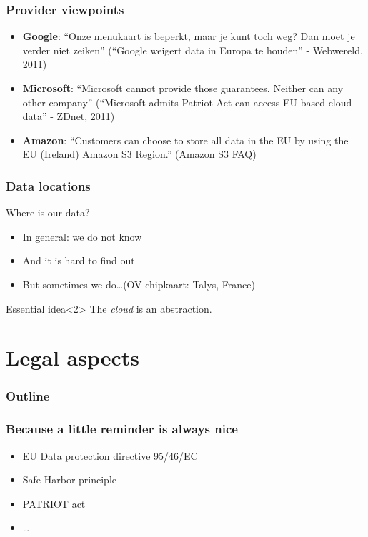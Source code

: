 \documentclass{beamer}
\begin{document}
\begin{frame}
    \frametitle{Provider viewpoints}
    \begin{itemize}
        \item \textbf{Google}: ``Onze menukaart is beperkt, maar je kunt toch weg? Dan moet
        je verder niet zeiken'' (``Google weigert data in Europa te houden'' -
        Webwereld, 2011)
    \item \textbf{Microsoft}: ``Microsoft cannot provide those guarantees. Neither can
        any other company'' (``Microsoft admits Patriot Act can access EU-based
        cloud data'' - ZDnet, 2011)
    \item \textbf{Amazon}: ``Customers can choose to store all data in the EU by using
        the EU (Ireland) Amazon S3 Region.'' (Amazon S3 FAQ)
    \end{itemize}
\end{frame}

\begin{frame}
    \frametitle{Data locations}
    Where is our data?
    \begin{itemize}
        \item In general: we do not know
        \item And it is hard to find out
        \item But sometimes we do\dots (OV chipkaart: Talys, France)
    \end{itemize}

    \begin{block}{Essential idea}<2>
    The \emph{cloud} is an abstraction.
    \end{block}
\end{frame}

\section{Legal aspects}

\begin{frame}
  \frametitle{Outline}
\end{frame}

\begin{frame}
    \frametitle{Because a little reminder is always nice}
    \begin{itemize}
        \item EU Data protection directive 95/46/EC
        \item Safe Harbor principle
        \item PATRIOT act
        \item \dots
    \end{itemize}
\end{frame}
\end{document}
